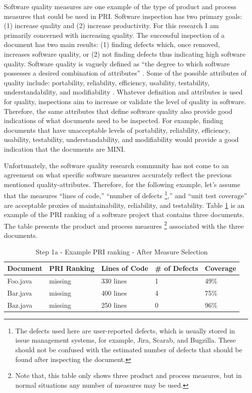 Software quality measures are one example of the type of product and
process measures that could be used in PRI. Software inspection has two
primary goals: (1) increase quality and (2) increase productivity. For this
research I am primarily concerned with increasing quality. The successful
inspection of a document has two main results: (1) finding defects which,
once removed, increases software quality, or (2) not finding defects thus
indicating high software quality. Software quality is vaguely defined as
``the degree to which software possesses a desired combination of
attributes'' \cite{IEEEGlossary83}. Some of the possible attributes of
quality include: portability, reliability, efficiency, usability,
testability, understandability, and modifiability \cite{Glass03}. Whatever
definition and attributes is used for quality, inspections aim to increase
or validate the level of quality in software. Therefore, the same
attributes that define software quality also provide good indications of
what documents need to be inspected. For example, finding documents that
have unacceptable levels of portability, reliability, efficiency,
usability, testability, understandability, and modifiability would provide
a good indication that the documents are MINI.

Unfortunately, the software quality research community has not come to an
agreement on what specific software measures accurately reflect the
previous mentioned quality-attributes. Therefore, for the following
example, let's assume that the measures ``lines of code,'' ``number of
defects \footnote{The defects used here are user-reported defects, which
  is usually stored in issue management systems, for example, Jira, Scarab,
  and Bugzilla. These should not be confused with the estimated number of
  defects that should be found after inspecting the document.},''  and ``unit
test coverage'' are acceptable proxies of maintainability, reliability, and
testability. Table \ref{table:step1a} is an example of the PRI ranking of a
software project that contains three documents. The table presents the
product and process measures \footnote{Note that, this table only shows
  three product and process measures, but in normal situations any number
  of measures may be used.} associated with the three documents.

\begin{table}[htbp]
  \caption{Step 1a - Example PRI ranking - After Measure Selection}
  \label{table:step1a}
  \begin{center}
    \begin{tabular}{|l|l|l|l|l|} \hline
      {\bf Document} & {\bf PRI Ranking} & {\bf Lines of Code} & {\bf \# of Defects} & 
      {\bf Coverage} \\ \hline
Foo.java & missing & 330 lines & 1 & 49\%  \\ \hline
Bar.java & missing & 400 lines & 4 & 75\%  \\ \hline
Baz.java & missing & 250 lines & 0 & 96\%  \\ \hline
    \end{tabular}
  \end{center}
\end{table}


